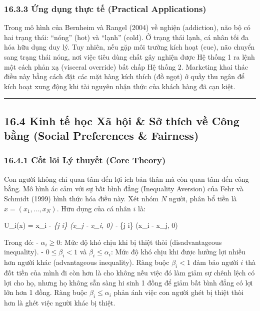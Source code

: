 \documentclass[
]{article}
\begin{document}
\subsubsection{16.3.3 Ứng dụng thực tế (Practical
Applications)}\label{ux1ee9ng-dux1ee5ng-thux1ef1c-tux1ebf-practical-applications-69}

Trong mô hình của Bernheim và Rangel (2004) về nghiện (addiction), não
bộ có hai trạng thái: ``nóng'' (hot) và ``lạnh'' (cold). Ở trạng thái
lạnh, cá nhân tối đa hóa hữu dụng duy lý. Tuy nhiên, nếu gặp môi trường
kích hoạt (cue), não chuyển sang trạng thái nóng, nơi việc tiêu dùng
chất gây nghiện được Hệ thống 1 ra lệnh một cách phản xạ (visceral
override) bất chấp Hệ thống 2. Marketing khai thác điều này bằng cách
đặt các mặt hàng kích thích (đồ ngọt) ở quầy thu ngân để kích hoạt xung
động khi tài nguyên nhận thức của khách hàng đã cạn kiệt.

\begin{center}\rule{0.5\linewidth}{0.5pt}\end{center}

\subsection{16.4 Kinh tế học Xã hội \& Sở thích về Công bằng (Social
Preferences \&
Fairness)}\label{kinh-tux1ebf-hux1ecdc-xuxe3-hux1ed9i-sux1edf-thuxedch-vux1ec1-cuxf4ng-bux1eb1ng-social-preferences-fairness}

\subsubsection{16.4.1 Cốt lõi Lý thuyết (Core
Theory)}\label{cux1ed1t-luxf5i-luxfd-thuyux1ebft-core-theory-63}

Con người không chỉ quan tâm đến lợi ích bản thân mà còn quan tâm đến
công bằng. Mô hình ác cảm với sự bất bình đẳng (Inequality Aversion) của
Fehr và Schmidt (1999) hình thức hóa điều này. Xét nhóm \(N\) người,
phân bổ tiền là \(x = (x_1, \dots, x_N)\). Hữu dụng của cá nhân \(i\)
là:

\[
\] U\_i(x) = x\_i -  \sum\emph{\{j \neq i\}
\max(x\_j - x\_i, 0) -  \sum}\{j \neq i\} \max(x\_i -
x\_j, 0) \[
\]

Trong đó: - \(\alpha_i \geq 0\): Mức độ khó chịu khi bị thiệt thòi
(disadvantageous inequality). - \(0 \leq \beta_i < 1\) và
\(\beta_i \leq \alpha_i\): Mức độ khó chịu khi được hưởng lợi nhiều hơn
người khác (advantageous inequality). Ràng buộc \(\beta_i < 1\) đảm bảo
người \(i\) thà đốt tiền của mình đi còn hơn là cho không nếu việc đó
làm giảm sự chênh lệch có lợi cho họ, nhưng họ không sẵn sàng hi sinh 1
đồng để giảm bất bình đẳng có lợi lớn hơn 1 đồng. Ràng buộc
\(\beta_i \leq \alpha_i\) phản ánh việc con người ghét bị thiệt thòi hơn
là ghét việc người khác bị thiệt.
\end{document}
